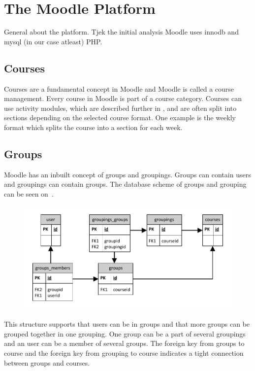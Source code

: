 
\section{The Moodle Platform}
\label{sec:moodleplatform}
	General about the platform. Tjek the initial analysis
Moodle uses innodb and mysql (in our case atleast) 
PHP.



\subsection{Courses}
Courses are a fundamental concept in Moodle and Moodle is called a course management.
Every course in Moodle is part of a course category. 
Courses can use activity modules, which are described further in \secref{}, and are often split into sections depending on the selected course format.
One example is the weekly format which splits the course into a section for each week. 
 


\subsection{Groups}
Moodle has an inbuilt concept of groups and groupings. 
Groups can contain users and groupings can contain groups. 
The database scheme of groups and grouping can be seen on~.

\begin{figure}
	\centering
		\includegraphics[width=\textwidth]{images/moodlegroups}
	\label{fig:moodlegroupsandgroupings}
\end{figure}

This structure supports that users can be in groups and that more groups can be grouped together in one grouping. 
One group can be a part of several groupings and an user can be a member of several groups. 
The foreign key from groups to course and the foreign key from grouping to course indicates a tight connection between groups and courses. 

